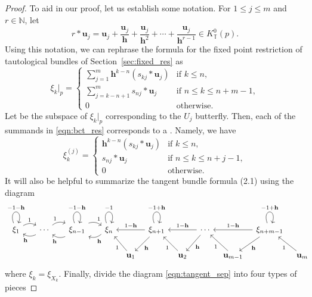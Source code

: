 \documentclass[pdftex]{sigma}
\numberwithin{equation}{section}
\newcommand{\torus}{\mathbb T}
\newcommand{\NN}{\mathbb N}
\newcommand{\hb}{\mathbf h}
\newcommand{\ub}{\mathbf u}
\newcommand{\cdloop}[1]{\ar[loop, distance = 2em, out=110, in=70, "#1"]}
\begin{document}
\begin{proof}

To aid in our proof, let us establish some notation. For $1\leq j \leq m$ and $r\in\NN$, let
\[
r*\ub_j = \ub_j + \frac{\ub_j}{\hb} + \frac{\ub_j}{\hb^2} + \cdots + \frac{\ub_j}{\hb^{r-1}} \in K^0_\torus(p).
\]
Using this notation, we can rephrase the formula for the fixed point restriction of tautological bundles of Section~\ref{sec:fixed_res} as
\begin{equation}
\label{eqn:bct_res}
\xi_k|_p = \begin{cases}
\displaystyle\sum_{j=1}^m \hb^{k-n}(s_{kj}*\ub_j) & \text{if }k\leq n, \\
\displaystyle\sum_{j=k-n+1}^{m} s_{nj}*\ub_j & \text{if }n\leq k \leq n+m-1, \\
0 & \text{otherwise}.
\end{cases}
\end{equation}
Let  be the subspace of $\xi_k|_p$ corresponding to the $U_j$ butterfly. Then, each of the summands in \eqref{eqn:bct_res} corresponds to a . Namely, we have
\begin{equation}
\label{eqn:bct_res_bfly}
\xi_k^{(j)} = \begin{cases}
\hb^{k-n}(s_{kj}*\ub_j) & \text{if }k\leq n, \\
s_{nj}*\ub_j & \text{if }n\leq k \leq n+j-1, \\
0 & \text{otherwise}.
\end{cases}
\end{equation}
It will also be helpful to summarize the tangent bundle formula (2.1) using the diagram
\begin{equation}
\label{eqn:tangent_sep}
\begin{tikzcd}[column sep = 0.8em]
\xi_1 \ar[rr, bend left, "1"] \cdloop{-1-\hb}
&& \cdots \ar[ll, bend left, "\hb"] \ar[rr, bend left, "1"]
&& \xi_{n - 1} \ar[ll, bend left, "\hb"] \ar[rr, bend left, "1"] \cdloop{-1-\hb}
&& \xi_n \ar[ll, bend left, "\hb"] \cdloop{-1}
&& \xi_{n + 1} \ar[ll, swap, "1-\hb"] \cdloop{-1+\hb} \ar[ld, "\hb"]
&& \cdots \ar[ll, swap, "1-\hb"] \ar[ld, "\hb"]
&& \xi_{n+m-1} \ar[ll, swap, "1-\hb"] \cdloop{-1+\hb} \ar[ld, "\hb"]
\\
&&&&&&&
\ub_{1} \ar[lu, "1"]
&& \ub_{2} \ar[lu, "1"]
&& \ub_{{m-1}} \ar[lu, "1"]
&& \ub_{m} \ar[lu, "1"]
\end{tikzcd}\!\!\!\!\!
\end{equation}
where $\xi_k = \xi_{X_k}$. Finally, divide the diagram \eqref{eqn:tangent_sep} into four types of pieces


\end{proof}
\end{document}
